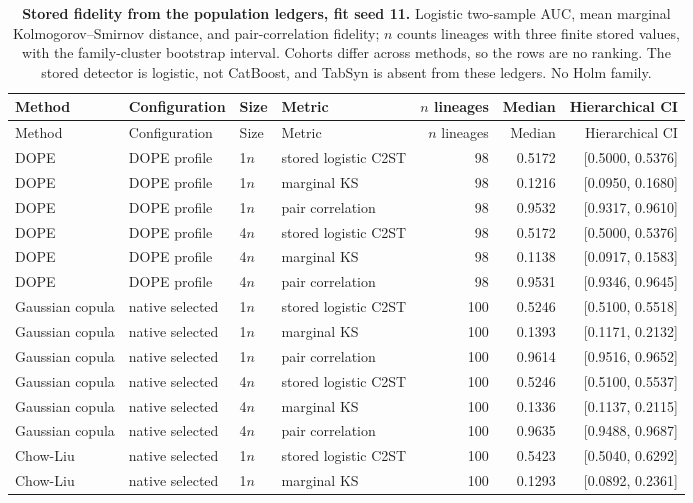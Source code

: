 \begin{longtable}{llllrrr}
\caption{\textbf{Stored fidelity from the population ledgers, fit seed 11.} Logistic two-sample AUC, mean marginal Kolmogorov--Smirnov distance, and pair-correlation fidelity; $n$ counts lineages with three finite stored values, with the family-cluster bootstrap interval. Cohorts differ across methods, so the rows are no ranking. The stored detector is logistic, not CatBoost, and TabSyn is absent from these ledgers. No Holm family.}\label{tab:review-fidelity}\\
\toprule
Method & Configuration & Size & Metric & $n$ lineages & Median & Hierarchical CI \\
\midrule
\endfirsthead
\toprule
Method & Configuration & Size & Metric & $n$ lineages & Median & Hierarchical CI \\
\midrule
\endhead
DOPE & DOPE profile & 1$n$ & stored logistic C2ST & 98 & 0.5172 & [0.5000, 0.5376] \\
DOPE & DOPE profile & 1$n$ & marginal KS & 98 & 0.1216 & [0.0950, 0.1680] \\
DOPE & DOPE profile & 1$n$ & pair correlation & 98 & 0.9532 & [0.9317, 0.9610] \\
DOPE & DOPE profile & 4$n$ & stored logistic C2ST & 98 & 0.5172 & [0.5000, 0.5376] \\
DOPE & DOPE profile & 4$n$ & marginal KS & 98 & 0.1138 & [0.0917, 0.1583] \\
DOPE & DOPE profile & 4$n$ & pair correlation & 98 & 0.9531 & [0.9346, 0.9645] \\
Gaussian copula & native selected & 1$n$ & stored logistic C2ST & 100 & 0.5246 & [0.5100, 0.5518] \\
Gaussian copula & native selected & 1$n$ & marginal KS & 100 & 0.1393 & [0.1171, 0.2132] \\
Gaussian copula & native selected & 1$n$ & pair correlation & 100 & 0.9614 & [0.9516, 0.9652] \\
Gaussian copula & native selected & 4$n$ & stored logistic C2ST & 100 & 0.5246 & [0.5100, 0.5537] \\
Gaussian copula & native selected & 4$n$ & marginal KS & 100 & 0.1336 & [0.1137, 0.2115] \\
Gaussian copula & native selected & 4$n$ & pair correlation & 100 & 0.9635 & [0.9488, 0.9687] \\
Chow-Liu & native selected & 1$n$ & stored logistic C2ST & 100 & 0.5423 & [0.5040, 0.6292] \\
Chow-Liu & native selected & 1$n$ & marginal KS & 100 & 0.1293 & [0.0892, 0.2361] \\

\end{longtable}
